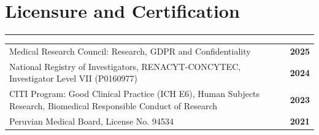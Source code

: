 \section{Licensure and Certification}
\vspace{-1.5em}
\textcolor{darkgray}{\rule{\textwidth}{0.5pt}}
\begin{longtable}{>{\raggedright\arraybackslash}p{16.4cm} p{1cm}}
Medical Research Council: Research, GDPR and Confidentiality & \textbf{2025} \\
National Registry of Investigators, RENACYT-CONCYTEC, Investigator Level VII (P0160977) & \textbf{2024} \\
CITI Program: Good Clinical Practice (ICH E6), Human Subjects Research, Biomedical Responsible Conduct of Research & \textbf{2023} \\
Peruvian Medical Board, License No. 94534 & \textbf{2021} \\
\end{longtable}
